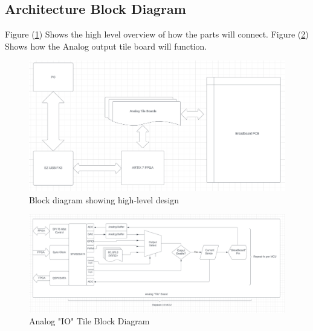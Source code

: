 \subsection{Architecture Block Diagram}
	Figure (\ref{fig:architecture.block_diagram}) Shows the high level overview of how the parts will connect. Figure (\ref{fig:architecture.tile_diagram}) Shows how the Analog output tile board will function.

	\begin{figure}[H]
		\centering
		\includegraphics[width=0.8\linewidth]{images/architecture.block_diagram.png}
		\caption{Block diagram showing high-level design}
		\label{fig:architecture.block_diagram}
		\vspace{15px}
	\end{figure}

	\begin{figure}[H]
		\centering
		\includegraphics[width=0.8\linewidth]{images/architecture.tile_diagram.png}
		\caption{Analog "IO" Tile Block Diagram}
		\label{fig:architecture.tile_diagram}
		\vspace{15px}
	\end{figure}